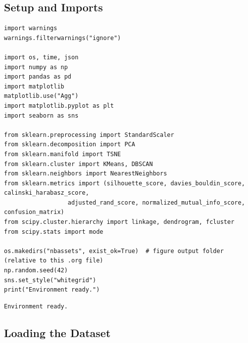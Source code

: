 \documentclass[12pt,a4paper]{article}
\begin{document}
\subsection{Setup and Imports}
\label{sec:orgda754e1}

\begin{verbatim}
import warnings
warnings.filterwarnings("ignore")

import os, time, json
import numpy as np
import pandas as pd
import matplotlib
matplotlib.use("Agg")
import matplotlib.pyplot as plt
import seaborn as sns

from sklearn.preprocessing import StandardScaler
from sklearn.decomposition import PCA
from sklearn.manifold import TSNE
from sklearn.cluster import KMeans, DBSCAN
from sklearn.neighbors import NearestNeighbors
from sklearn.metrics import (silhouette_score, davies_bouldin_score, calinski_harabasz_score,
			      adjusted_rand_score, normalized_mutual_info_score, confusion_matrix)
from scipy.cluster.hierarchy import linkage, dendrogram, fcluster
from scipy.stats import mode

os.makedirs("nbassets", exist_ok=True)  # figure output folder (relative to this .org file)
np.random.seed(42)
sns.set_style("whitegrid")
print("Environment ready.")
\end{verbatim}

\begin{verbatim}
Environment ready.
\end{verbatim}

\subsection{Loading the Dataset}
\label{sec:org3d24333}
\end{document}
